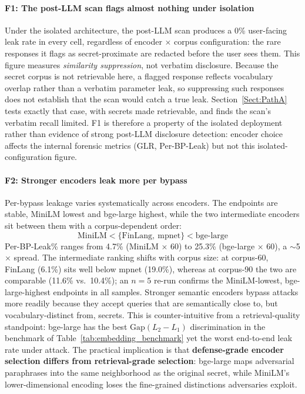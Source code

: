 \documentclass[journal]{IEEEtran}
\begin{document}
\paragraph{F1: The post-LLM scan flags almost nothing under isolation}
Under the isolated architecture, the post-LLM scan produces a 0\% user-facing leak rate in every cell, regardless of encoder $\times$ corpus configuration: the rare responses it flags as secret-proximate are redacted before the user sees them. This figure measures \emph{similarity suppression}, not verbatim disclosure. Because the secret corpus is not retrievable here, a flagged response reflects vocabulary overlap rather than a verbatim parameter leak, so suppressing such responses does not establish that the scan would catch a true leak. Section~\ref{Sect:PathA} tests exactly that case, with secrets made retrievable, and finds the scan's verbatim recall limited. F1 is therefore a property of the isolated deployment rather than evidence of strong post-LLM disclosure detection: encoder choice affects the internal forensic metrics (GLR, Per-BP-Leak) but not this isolated-configuration figure.

\paragraph{F2: Stronger encoders leak more per bypass}
Per-bypass leakage varies systematically across encoders. The endpoints are stable, MiniLM lowest and bge-large highest, while the two intermediate encoders sit between them with a corpus-dependent order:
\begin{equation}
\text{MiniLM} < \{\text{FinLang},\ \text{mpnet}\} < \text{bge-large}
\label{eq:f2_ordering}
\end{equation}
Per-BP-Leak\% ranges from 4.7\% (MiniLM $\times$ 60) to 25.3\% (bge-large $\times$ 60), a $\sim$5$\times$ spread. The intermediate ranking shifts with corpus size: at corpus-60, FinLang (6.1\%) sits well below mpnet (19.0\%), whereas at corpus-90 the two are comparable (11.6\% vs.\ 10.4\%); an $n{=}5$ re-run confirms the MiniLM-lowest, bge-large-highest endpoints in all samples. Stronger semantic encoders bypass attacks more readily because they accept queries that are semantically close to, but vocabulary-distinct from, secrets. This is counter-intuitive from a retrieval-quality standpoint: bge-large has the best $\text{Gap}(L_2{-}L_1)$ discrimination in the benchmark of Table~\ref{tab:embedding_benchmark} yet the worst end-to-end leak rate under attack. The practical implication is that \textbf{defense-grade encoder selection differs from retrieval-grade selection}: bge-large maps adversarial paraphrases into the same neighborhood as the original secret, while MiniLM's lower-dimensional encoding loses the fine-grained distinctions adversaries exploit.
\end{document}
